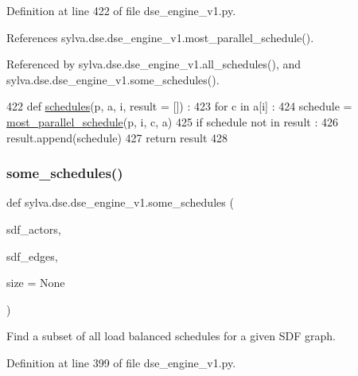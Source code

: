 Definition at line 422 of file dse\+\_\+engine\+\_\+v1.\+py.



References sylva.\+dse.\+dse\+\_\+engine\+\_\+v1.\+most\+\_\+parallel\+\_\+schedule().



Referenced by sylva.\+dse.\+dse\+\_\+engine\+\_\+v1.\+all\+\_\+schedules(), and sylva.\+dse.\+dse\+\_\+engine\+\_\+v1.\+some\+\_\+schedules().


\begin{DoxyCode}
422 \textcolor{keyword}{def }\hyperlink{namespacesylva_1_1dse_1_1dse__engine__v1_a9f62832c5ef72269c1920b61d0eeb2a6}{schedules}(p, a, i, result = []) :
423   \textcolor{keywordflow}{for} c \textcolor{keywordflow}{in} a[i] :
424     schedule = \hyperlink{namespacesylva_1_1dse_1_1dse__engine__v1_a2c16f997588f8721ab7742ca16e79e64}{most\_parallel\_schedule}(p, i, c, a)
425     \textcolor{keywordflow}{if} schedule \textcolor{keywordflow}{not} \textcolor{keywordflow}{in} result :
426       result.append(schedule)
427   \textcolor{keywordflow}{return} result
428 
\end{DoxyCode}
\mbox{\label{namespacesylva_1_1dse_1_1dse__engine__v1_a4a316401cfa961e555596115afe86b4c}} 
\subsubsection{\texorpdfstring{some\+\_\+schedules()}{some\_schedules()}}
{\footnotesize\ttfamily def sylva.\+dse.\+dse\+\_\+engine\+\_\+v1.\+some\+\_\+schedules (\begin{DoxyParamCaption}\item[{}]{sdf\+\_\+actors,  }\item[{}]{sdf\+\_\+edges,  }\item[{}]{size = {\ttfamily None} }\end{DoxyParamCaption})}

\begin{DoxyVerb}  Find a subset of all load balanced schedules for a given SDF graph.
\end{DoxyVerb}
 

Definition at line 399 of file dse\+\_\+engine\+\_\+v1.\+py.



